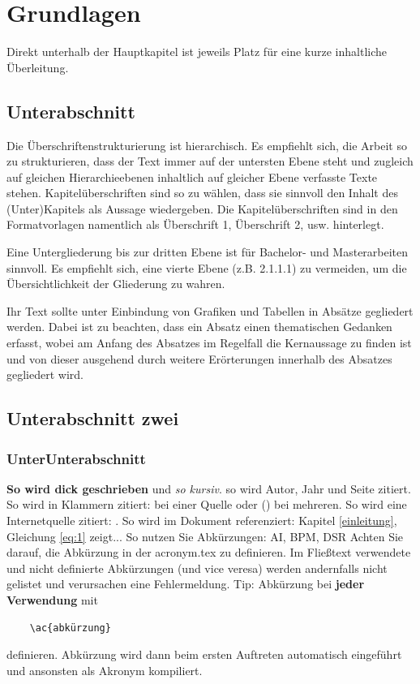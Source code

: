 \section{Grundlagen} \label{grundlagen}

Direkt unterhalb der Hauptkapitel ist jeweils Platz für eine kurze inhaltliche Überleitung.

\subsection{Unterabschnitt}

Die Überschriftenstrukturierung ist hierarchisch. Es empfiehlt sich, die Arbeit so zu strukturieren, dass der Text immer auf der untersten Ebene steht und zugleich auf gleichen Hierarchieebenen inhaltlich auf gleicher Ebene verfasste Texte stehen. Kapitelüberschriften sind so zu wählen, dass sie sinnvoll den Inhalt des (Unter)Kapitels als Aussage wiedergeben. Die Kapitelüberschriften sind in den Formatvorlagen namentlich als Überschrift 1, Überschrift 2, usw. hinterlegt.

Eine Untergliederung bis zur dritten Ebene ist für Bachelor- und Masterarbeiten sinnvoll. Es empfiehlt sich, eine vierte Ebene (z.B. 2.1.1.1) zu vermeiden, um die Übersichtlichkeit der Gliederung zu wahren.

Ihr Text sollte unter Einbindung von Grafiken und Tabellen in Absätze gegliedert werden. Dabei ist zu beachten, dass ein Absatz einen thematischen Gedanken erfasst, wobei am Anfang des Absatzes im Regelfall die Kernaussage zu finden ist und von dieser ausgehend durch weitere Erörterungen innerhalb des Absatzes gegliedert wird.

\subsection{Unterabschnitt zwei}

\subsubsection{UnterUnterabschnitt}

\textbf{So wird dick geschrieben} und \textit{so kursiv}. \citet[685]{janiesch2021machine} so wird Autor, Jahr und Seite zitiert. So wird in Klammern zitiert: \citep[685]{janiesch2021machine} bei einer Quelle oder (\cites[685]{janiesch2021machine}[289]{herm2021symbolic}) bei mehreren. So wird eine Internetquelle zitiert: \citet{diewi}. So wird im Dokument referenziert: Kapitel \ref{einleitung}, Gleichung \ref{eq:1} zeigt...
So nutzen Sie Abkürzungen: \ac{AI}, \ac{BPM}, \ac{DSR} Achten Sie darauf, die Abkürzung in der acronym.tex zu definieren. Im Fließtext verwendete und nicht definierte Abkürzungen (und vice veresa) werden andernfalls nicht gelistet und verursachen eine Fehlermeldung. Tip: Abkürzung bei \textbf{jeder Verwendung} mit \begin{verbatim} 
    \ac{abkürzung}
\end{verbatim} definieren. Abkürzung wird dann beim ersten Auftreten automatisch eingeführt und ansonsten als Akronym kompiliert.

